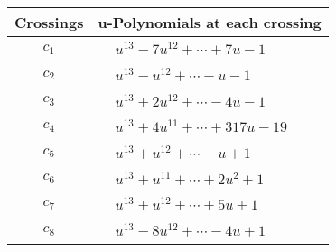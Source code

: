 \documentclass[1p]{elsarticle_modified}
\theoremstyle{definition}
\begin{document}
\begin{tabular}{m{50pt}|m{274pt}}
Crossings & \hspace{64pt}u-Polynomials at each crossing \\
\hline $$\begin{aligned}c_{1}\end{aligned}$$&$\begin{aligned}
&u^{13}-7 u^{12}+\cdots+7 u-1
\end{aligned}$\\
\hline $$\begin{aligned}c_{2}\end{aligned}$$&$\begin{aligned}
&u^{13}- u^{12}+\cdots- u-1
\end{aligned}$\\
\hline $$\begin{aligned}c_{3}\end{aligned}$$&$\begin{aligned}
&u^{13}+2 u^{12}+\cdots-4 u-1
\end{aligned}$\\
\hline $$\begin{aligned}c_{4}\end{aligned}$$&$\begin{aligned}
&u^{13}+4 u^{11}+\cdots+317 u-19
\end{aligned}$\\
\hline $$\begin{aligned}c_{5}\end{aligned}$$&$\begin{aligned}
&u^{13}+u^{12}+\cdots- u+1
\end{aligned}$\\
\hline $$\begin{aligned}c_{6}\end{aligned}$$&$\begin{aligned}
&u^{13}+u^{11}+\cdots+2 u^2+1
\end{aligned}$\\
\hline $$\begin{aligned}c_{7}\end{aligned}$$&$\begin{aligned}
&u^{13}+u^{12}+\cdots+5 u+1
\end{aligned}$\\
\hline $$\begin{aligned}c_{8}\end{aligned}$$&$\begin{aligned}
&u^{13}-8 u^{12}+\cdots-4 u+1
\end{aligned}$\\

\end{tabular}
\end{document}
